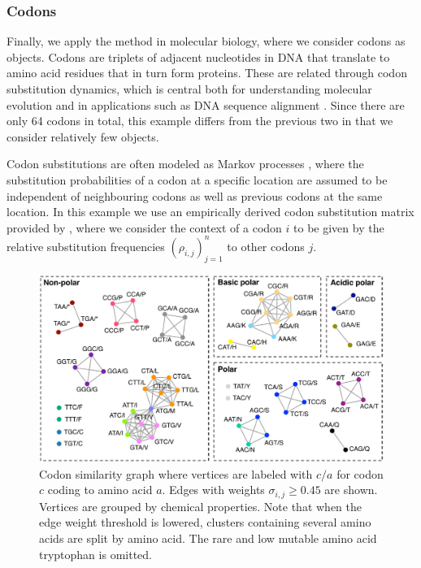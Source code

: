 \documentclass{kais}
\newcommand{\rn}[1]{\rho_{#1}}
\newcommand{\sy}[1]{\sigma_{#1}}
\begin{document}
\subsubsection{Codons}

Finally, we apply the method in molecular biology, where we consider codons as objects. Codons are triplets of
adjacent nucleotides in DNA that translate to amino acid residues that in turn form proteins.  These are related
through codon substitution dynamics, which is central both for understanding molecular evolution and in applications
such as DNA sequence alignment \cite{Anisimova09}. Since there are only 64 codons in total, this example differs from
the previous two in that we consider relatively few objects.

Codon substitutions are often modeled as Markov processes \cite{Anisimova09}, where the
substitution probabilities of a codon at a specific location are assumed to be independent of neighbouring codons as
well as previous codons at the same location. In this example we use an empirically derived codon substitution matrix 
provided by , where we consider the context of a codon $i$ to be given by the relative substitution frequencies
$(\rn{i,j})_{j=1}^n$ to other codons $j$.

\begin{figure}
\centerline{\includegraphics[width=0.9\columnwidth]{figures/codon-example.pdf}}
\caption{Codon similarity graph where vertices are labeled with $c/a$ for codon $c$ coding to amino acid $a$. Edges
with weights $\sy{i,j} \geq 0.45$ are shown. Vertices are grouped by
chemical properties. Note that when the edge weight threshold is lowered, clusters containing several amino acids are split by
amino acid. The rare and low mutable amino acid tryptophan is omitted. }
\label{fig:codons}
\end{figure}
\end{document}
